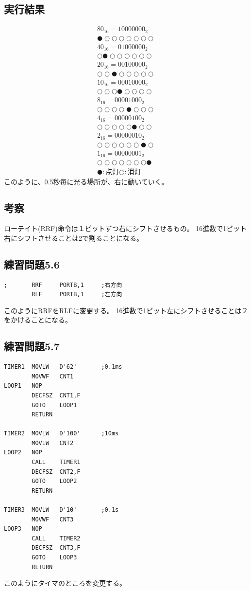 \documentclass[a4paper,12pt]{ujarticle}
\begin{document}
  \subsection{実行結果}
  \begin{eqnarray*}
   {80}_{16} = 10000000_2 \\
   ●○○○○○○○ \\
   {40}_{16} = 01000000_2 \\
   ○●○○○○○○ \\
   {20}_{16} = 00100000_2 \\
   ○○●○○○○○ \\
   {10}_{16} = 00010000_2 \\
   ○○○●○○○○ \\
   {8}_{16}  = 00001000_2 \\
   ○○○○●○○○ \\
   {4}_{16}  = 00000100_2 \\
   ○○○○○●○○ \\
   {2}_{16}  = 00000010_2 \\
   ○○○○○○●○ \\
   {1}_{16}  = 00000001_2 \\
   ○○○○○○○● \\
   ●:点灯○:消灯
  \end{eqnarray*}
  このように、0.5秒毎に光る場所が、右に動いていく。
  \subsection{考察}
  ローテイト(RRF)命令は１ビットずつ右にシフトさせるもの。
  16進数で1ビット右にシフトさせることは2で割ることになる。
  \subsection{練習問題5.6}
  \begin{lstlisting}[basicstyle=\ttfamily\footnotesize, frame=single]
;       RRF     PORTB,1     ;右方向
        RLF     PORTB,1     ;左方向
  \end{lstlisting}
  このようにRRFをRLFに変更する。
  16進数で1ビット左にシフトさせることは２をかけることになる。
  \subsection{練習問題5.7}
  \begin{lstlisting}[basicstyle=\ttfamily\footnotesize, frame=single]
TIMER1  MOVLW   D'62'       ;0.1ms
        MOVWF   CNT1
LOOP1   NOP
        DECFSZ  CNT1,F
        GOTO    LOOP1
        RETURN

TIMER2  MOVLW   D'100'      ;10ms
        MOVLW   CNT2
LOOP2   NOP
        CALL    TIMER1
        DECFSZ  CNT2,F
        GOTO    LOOP2
        RETURN

TIMER3  MOVLW   D'10'       ;0.1s
        MOVWF   CNT3
LOOP3   NOP
        CALL    TIMER2
        DECFSZ  CNT3,F
        GOTO    LOOP3
        RETURN
  \end{lstlisting}
  このようにタイマのところを変更する。
  \clearpage
\end{document}
